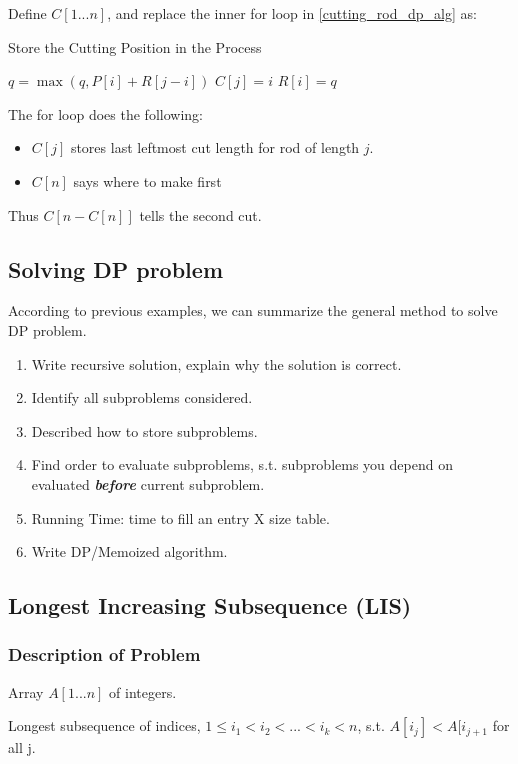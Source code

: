 Define $C[1...n]$, and replace the inner for loop in \cref{cutting_rod_dp_alg} as:
\begin{algorithm}[H]
\caption{Store the Cutting Position in the Process}
\begin{algorithmic}[1]
    \State $q = \max(q, P[i] + R[j-i])$
    \State $C[j] = i$
\EndFor
\State $R[i] = q$
\end{algorithmic}
\end{algorithm}

The for loop does the following:
\begin{itemize}
\item $C[j]$ stores last leftmost cut length for rod of length $j$.
\item $C[n]$ says where to make first
\end{itemize}

Thus $C[n - C[n]]$ tells the second cut.

\subsection{Solving DP problem}
According to previous examples, we can summarize the general method to solve DP problem.

\begin{enumerate}
\item Write recursive solution, explain why the solution is correct.
\item Identify all subproblems considered.
\item Described how to store subproblems.
\item Find order to evaluate subproblems, s.t. subproblems you depend on evaluated \textbf{\textit{before}} current subproblem.
\item Running Time: time to fill an entry X size table.
\item Write DP/Memoized algorithm.
\end{enumerate}

\subsection{Longest Increasing Subsequence (LIS)}
\subsubsection{Description of Problem}
\AlgoInput Array $A[1...n]$ of integers.

\AlgoOutput Longest subsequence of indices, $1 \leq i_1 < i_2 < ... < i_k < n$, s.t. $A[i_j] < A[i_{j+1}$ for all j.

